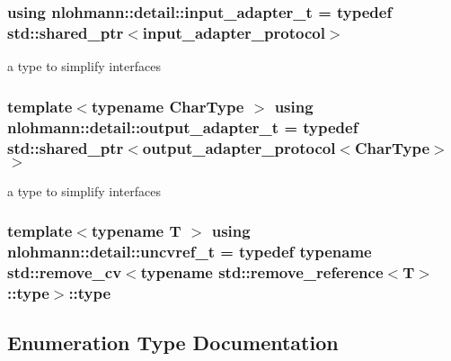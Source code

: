 \subsubsection[{\texorpdfstring{input\+\_\+adapter\+\_\+t}{input_adapter_t}}]{\setlength{\rightskip}{0pt plus 5cm}using {\bf nlohmann\+::detail\+::input\+\_\+adapter\+\_\+t} = typedef std\+::shared\+\_\+ptr$<${\bf input\+\_\+adapter\+\_\+protocol}$>$}\hypertarget{namespacenlohmann_1_1detail_ae132f8cd5bb24c5e9b40ad0eafedf1c2}{}\label{namespacenlohmann_1_1detail_ae132f8cd5bb24c5e9b40ad0eafedf1c2}


a type to simplify interfaces 

\subsubsection[{\texorpdfstring{output\+\_\+adapter\+\_\+t}{output_adapter_t}}]{\setlength{\rightskip}{0pt plus 5cm}template$<$typename Char\+Type $>$ using {\bf nlohmann\+::detail\+::output\+\_\+adapter\+\_\+t} = typedef std\+::shared\+\_\+ptr$<${\bf output\+\_\+adapter\+\_\+protocol}$<$Char\+Type$>$$>$}\hypertarget{namespacenlohmann_1_1detail_a0fd8edff7729aa2dd92b070964bade2e}{}\label{namespacenlohmann_1_1detail_a0fd8edff7729aa2dd92b070964bade2e}


a type to simplify interfaces 

\subsubsection[{\texorpdfstring{uncvref\+\_\+t}{uncvref_t}}]{\setlength{\rightskip}{0pt plus 5cm}template$<$typename T $>$ using {\bf nlohmann\+::detail\+::uncvref\+\_\+t} = typedef typename std\+::remove\+\_\+cv$<$typename std\+::remove\+\_\+reference$<$T$>$\+::type$>$\+::type}\hypertarget{namespacenlohmann_1_1detail_a53a082eedad9f4729fcd8fed552a21f7}{}\label{namespacenlohmann_1_1detail_a53a082eedad9f4729fcd8fed552a21f7}


\subsection{Enumeration Type Documentation}
